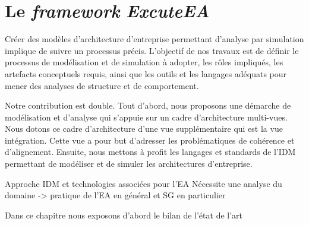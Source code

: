\chapter{Le \emph{framework} \emph{ExcuteEA} }
\label{ch:proposition}

\PartialToc



Créer des modèles d'architecture d'entreprise permettant d'analyse par
simulation implique de suivre un processus précis. L'objectif de nos travaux est
de définir le processus de modélisation et de simulation à adopter, les rôles
impliqués, les artefacts conceptuels requis, ainsi que les outils et les
langages adéquats pour mener des analyses de structure et de comportement.

Notre contribution est double. Tout d'abord, nous proposons une démarche de
modélisation et d'analyse qui s'appuie sur un cadre d'architecture multi-vues.
Nous dotons ce cadre d'architecture d'une vue supplémentaire qui est la vue
intégration. Cette vue a pour but d'adresser les problématiques de cohérence et
d'alignement. Ensuite, nous mettons à profit les langages et standards de l'IDM
permettant de modéliser et de simuler les architectures d'entreprise.

    Approche IDM et technologies associées pour l'EA Nécessite une analyse du
    domaine -> pratique de l'EA en général et SG en particulier


Dans ce chapitre nous exposons d'abord le bilan de l'état de l'art




















